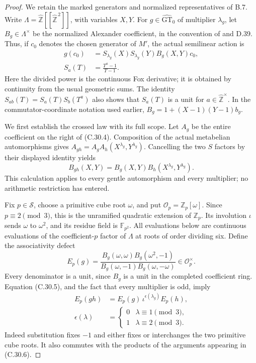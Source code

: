 \begin{proof}
We retain the marked generators and normalized representatives of B.7.
Write $\Lambda=\widehat{\mathbb Z}[[\widehat{\mathbb Z}^{\,2}]]$,
with variables $X,Y$. For $g\in\widehat{\mathrm{GT}}_0$ of multiplier
$\lambda_g$, let $B_g\in\Lambda^\times$ be the normalized Alexander
coefficient, in the convention of
\cite[\S2.3, p.~101]{PBC_Furusho2003} and D.39. Thus, if $c_0$ denotes
the chosen generator of $M'$, the actual semilinear action is
\[
 \begin{aligned}
 g(c_0)&=S_{\lambda_g}(X)S_{\lambda_g}(Y)B_g(X,Y)c_0,\\
 S_a(T)&=\frac{T^a-1}{T-1}.
 \end{aligned}
 \tag{C.30.4}
\]
Here the divided power is the continuous Fox derivative; it is obtained
by continuity from the usual geometric sums. The identity
$S_{ab}(T)=S_a(T)S_b(T^a)$ also shows that $S_a(T)$ is a unit for
$a\in\widehat{\mathbb Z}^{\times}$. In the commutator-coordinate
notation used earlier, $B_g=1+(X-1)(Y-1)b_g$.

We first establish the crossed law with its full scope. Let $A_g$ be
the entire coefficient on the right of (C.30.4). Composition of the
actual metabelian automorphisms gives
$A_{gh}=A_gA_h(X^{\lambda_g},Y^{\lambda_g})$. Cancelling the two
$S$ factors by their displayed identity yields
\[
 B_{gh}(X,Y)=B_g(X,Y)
              B_h(X^{\lambda_g},Y^{\lambda_g}).
 \tag{C.30.5}
\]
This calculation applies to every gentle automorphism and every
multiplier; no arithmetic restriction has entered.

Fix $p\in\mathcal S$, choose a primitive cube root $\omega$, and put
$\mathcal O_p=\mathbb Z_p[\omega]$. Since $p\equiv2\pmod3$, this is
the unramified quadratic extension of $\mathbb Z_p$. Its involution
$\iota$ sends $\omega$ to $\omega^2$, and its residue field is
$\mathbb F_{p^2}$. All evaluations below are continuous evaluations
of the coefficient-$p$ factor of $\Lambda$ at roots of order dividing
six. Define the associativity defect
\[
 E_p(g)=
 \frac{B_g(\omega,\omega)B_g(\omega^2,-1)}
      {B_g(\omega,-1)B_g(\omega,-\omega)}
       \in\mathcal O_p^\times.
 \tag{C.30.6}
\]
Every denominator is a unit, since $B_g$ is a unit in the completed
coefficient ring. Equation (C.30.5), and the fact that every multiplier
is odd, imply
\[
 \begin{aligned}
 E_p(gh)&=E_p(g)\,\iota^{\epsilon(\lambda_g)}E_p(h),\\
 \epsilon(\lambda)&=
 \begin{cases}0&\lambda\equiv1\pmod3,\\1&\lambda\equiv2\pmod3.
 \end{cases}
 \end{aligned}
 \tag{C.30.7}
\]
Indeed substitution fixes $-1$ and either fixes or interchanges the two
primitive cube roots. It also commutes with the products of the
arguments appearing in (C.30.6).


\end{proof}
